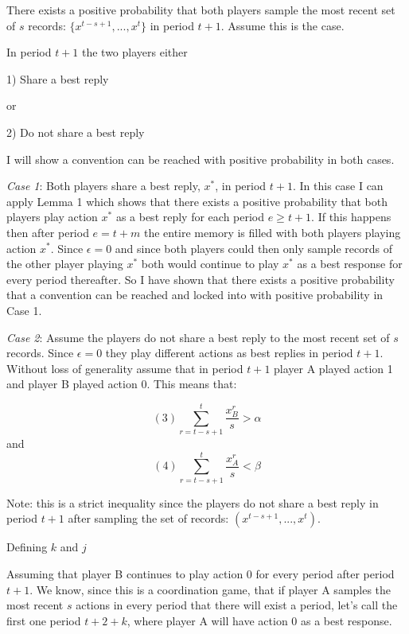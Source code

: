 \documentclass{article}
\begin{document}
\vskip12pt

There exists a positive probability that both players sample the most recent set of $s$ records: $\{x^{t-s+1},...,x^{t}\}$ in period $t+1$. Assume this is the case.

\vskip12pt

In period $t+1$ the two players either

1) Share a best reply

or 

2) Do not share a best reply

I will show a convention can be reached with positive probability in both cases.

\textit{Case 1}: Both players share a best reply, $x^*$, in period $t+1$. In this case I can apply Lemma 1 which shows that there exists a positive probability that both players play action $x^*$ as a best reply for each period $e \geq t+1$. If this happens then after period $e=t+m$ the entire memory is filled with both players playing action $x^*$. Since $\epsilon=0$ and since both players could then only sample records of the other player playing $x^*$ both would continue to play $x^*$ as a best response for every period thereafter. So I have shown that there exists a positive probability that a convention can be reached and locked into with positive probability in Case 1. 

\vskip24pt

\textit{Case 2}: Assume the players do not share a best reply to the most recent set of $s$ records. Since $\epsilon=0$ they play different actions as best replies in period $t+1$. Without loss of generality assume that in period $t+1$ player A played action 1 and player B played action 0. This means that:

$$(3) \sum\limits_{r=t-s+1}^{t} \frac{x^r_B}{s} > \alpha$$
and
$$(4) \sum\limits_{r=t-s+1}^{t} \frac{x^r_A}{s} < \beta$$

Note: this is a strict inequality since the players do not share a best reply in period $t+1$ after sampling the set of records: $(x^{t-s+1},...,x^{t})$.

\vskip12pt

\centering

Defining $k$ and $j$

\vskip6pt

\raggedright

Assuming that player B continues to play action 0 for every period after period $t+1$. We know, since this is a coordination game, that if player A samples the most recent $s$ actions in every period that there will exist a period, let's call the first one period $t+2+k$, where player A will have action 0 as a best response.
\end{document}
